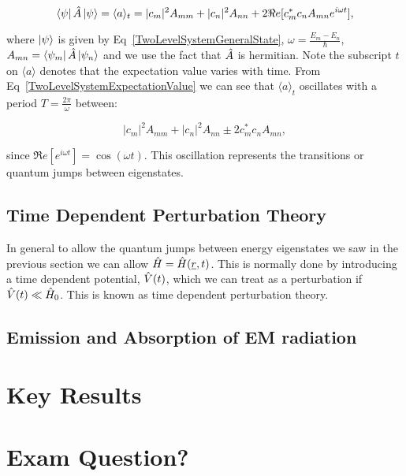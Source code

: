 \begin{equation}
    \bra{\psi}\Hat{A}\ket{\psi} = \langle a \rangle _t = |c_m|^2 A_{mm} + |c_n|^2 A_{nn} + 2 \Re e[c_m^* c_n A_{mn} e^{i\omega t}],
    \label{TwoLevelSystemExpectationValue}
\end{equation}

\noindent where $\ket{\psi}$ is given by Eq~\ref{TwoLevelSystemGeneralState}, $\omega = \frac{E_m - E_n}{\hbar}$, $A_{mn} = \bra{\psi_m}\Hat{A}\ket{\psi_n}$ and we use the fact that $\Hat{A}$ is hermitian. Note the subscript $t$ on $\langle a \rangle$ denotes that the expectation value varies with time. From Eq~\ref{TwoLevelSystemExpectationValue} we can see that $\langle a \rangle _t$ oscillates with a period $T = \frac{2\pi}{\omega}$ between:

\begin{equation}
    |c_m|^2 A_{mm} + |c_n|^2 A_{nn} \pm 2 c_m^* c_n A_{mn},
\end{equation}

\noindent since $\Re e[e^{i \omega t}] = \cos(\omega t)$. This oscillation represents the transitions or quantum jumps between eigenstates.

\subsection{Time Dependent Perturbation Theory}

In general to allow the quantum jumps between energy eigenstates we saw in the previous section we can allow $\Hat{H} = \Hat{H}(\underline{r}, t)$. This is normally done by introducing a time dependent potential, $\Hat{V}(t)$, which we can treat as a perturbation if $\Hat{V}(t) \ll \Hat{H}_0$. This is known as time dependent perturbation theory.

\subsection{Emission and Absorption of EM radiation}

\section{Key Results}

\section{Exam Question?}

